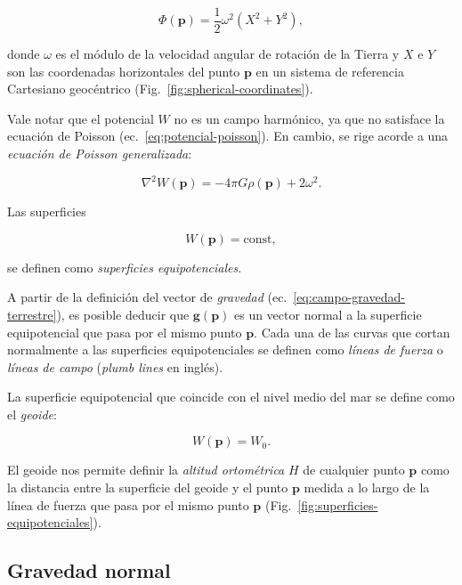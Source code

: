 \begin{equation}
    \Phi(\mathbf{p}) = \frac{1}{2} \omega^2 (X^2 + Y^2),
    \label{eq:potencial-centrifugo}
\end{equation}

\noindent donde $\omega$ es el módulo de la velocidad angular de rotación de la
Tierra y $X$ e $Y$ son las coordenadas horizontales del punto $\mathbf{p}$ en
un sistema de referencia Cartesiano geocéntrico
(Fig.~\ref{fig:spherical-coordinates}).

Vale notar que el potencial $W$ no es un campo harmónico, ya que no satisface
la ecuación de Poisson (ec.~\ref{eq:potencial-poisson}). En cambio, se rige
acorde a una \emph{ecuación de Poisson generalizada}:

\begin{equation}
    \nabla^2 W(\mathbf{p}) = - 4\pi G \rho(\mathbf{p}) + 2 \omega^2.
\end{equation}

Las superficies

\begin{equation}
    W(\mathbf{p}) = \text{const},
\end{equation}

\noindent se definen como \emph{superficies equipotenciales}.

A partir de la definición del vector de \emph{gravedad}
(ec.~\ref{eq:campo-gravedad-terrestre}), es posible deducir que
$\mathbf{g}(\mathbf{p})$ es un vector normal a la superficie equipotencial que
pasa por el mismo punto $\mathbf{p}$.
Cada una de las curvas que cortan normalmente a las superficies equipotenciales
se definen como \emph{líneas de fuerza} o \emph{líneas de campo}
(\emph{plumb lines} en inglés).

La superficie equipotencial que coincide con el nivel medio del mar se define
como el \emph{geoide}:

\begin{equation}
    W(\mathbf{p}) = W_0.
\end{equation}

\noindent El geoide nos permite definir la \emph{altitud ortométrica} $H$ de
cualquier punto $\mathbf{p}$ como la distancia entre la superficie del geoide
y el punto $\mathbf{p}$ medida a lo largo de la línea de fuerza que pasa por el
mismo punto $\mathbf{p}$ (Fig.~\ref{fig:superficies-equipotenciales}).


\subsection{Gravedad normal}

